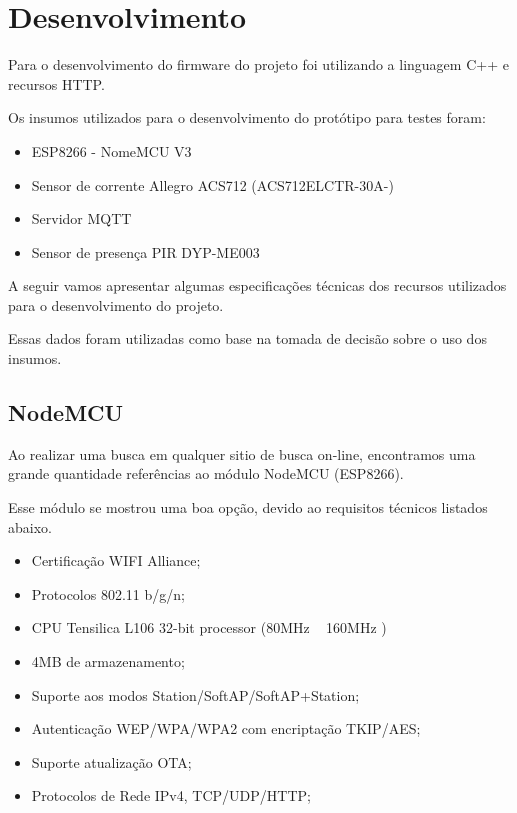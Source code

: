 \documentclass[openright]{normas-utf-tex} %
\begin{document}
\chapter{Desenvolvimento}
\label{chap:desenv}

 
Para o desenvolvimento do firmware do projeto foi utilizando a linguagem C++   \cite{Altabooks} e recursos HTTP.

Os insumos utilizados para o desenvolvimento do protótipo para testes foram:

\begin{itemize}
       	\item ESP8266 - NomeMCU V3
        \item Sensor de corrente Allegro ACS712 (ACS712ELCTR-30A-)
        \item Servidor MQTT
        \item Sensor de presença PIR DYP-ME003
\end{itemize}

A seguir vamos apresentar algumas especificações técnicas dos recursos utilizados para o desenvolvimento do projeto.

Essas dados foram utilizadas como base na tomada de decisão sobre o uso dos insumos. 

\section{NodeMCU}
Ao realizar uma busca em qualquer sitio de busca on-line, encontramos uma grande quantidade referências ao módulo NodeMCU (ESP8266).

Esse módulo se mostrou uma boa opção, devido ao requisitos técnicos listados abaixo.

\begin{itemize}
    \item Certificação WIFI Alliance;  \cite{espressif}
    \item Protocolos 802.11 b/g/n;\cite{espressif}
    \item CPU Tensilica L106 32-bit processor (80MHz ~ 160MHz )  \cite{Novatec}
    \item 4MB de armazenamento;
    \item Suporte aos modos Station/SoftAP/SoftAP+Station;\cite{espressif}
    \item Autenticação WEP/WPA/WPA2 com encriptação TKIP/AES;\cite{espressif}
    \item Suporte atualização OTA;\cite{espressif}
    \item Protocolos de Rede IPv4, TCP/UDP/HTTP;\cite{espressif}
\end{itemize}
\end{document}
